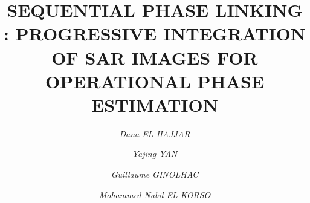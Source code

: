 \title{\textbf{SEQUENTIAL PHASE LINKING : PROGRESSIVE INTEGRATION OF \acs{SAR} IMAGES FOR OPERATIONAL PHASE ESTIMATION}}

\author[1,2]{\textit{Dana EL HAJJAR}}
\author[1]{\textit{Yajing YAN}}
\author[1]{\textit{Guillaume GINOLHAC}}
\author[2]{\textit{Mohammed Nabil EL KORSO}}
{
    \makeatletter
    \renewcommand\AB@affilsepx{: \protect\Affilfont}
    \makeatother
}
\date{}
